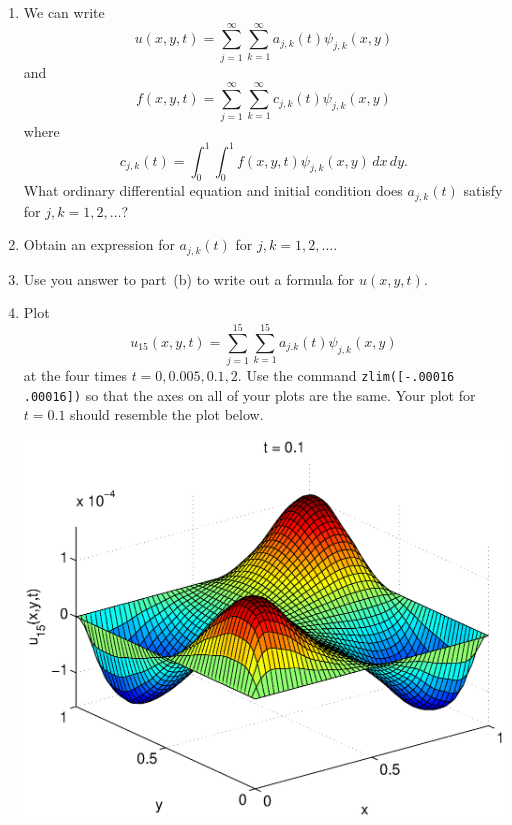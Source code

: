 \begin{enumerate}
\item We can write
\[
u(x,y,t) = \sum_{j=1}^\infty \sum_{k=1}^\infty a_{j,k}(t) \psi_{j,k} (x,y)
\]
and
\[
f(x,y,t) = \sum_{j=1}^\infty \sum_{k=1}^\infty c_{j,k}(t) \psi_{j,k} (x,y)
\]
where
\[
c_{j,k}(t) = \int_0^1 \int_0^1 f(x,y,t) \psi_{j,k} (x,y)\,dx\,dy.
\]
What ordinary differential equation and initial condition does $a_{j,k}(t)$ satisfy for $j,k = 1,2,\ldots$?
\\
\item Obtain an expression for $a_{j,k}(t)$ for $j,k=1,2,\ldots$.
\\
\item Use you answer to part~(b) to write out a formula for $u(x,y,t)$.
\\
\item Plot
\[
u_{15}(x,y,t) = \sum_{j=1}^{15} \sum_{k=1}^{15}a_{j.k}(t)\psi_{j,k}(x,y)
\]
at the four times $t=0, 0.005, 0.1, 2$. Use the command \verb|zlim([-.00016 .00016])| so that the axes on all of your plots are the same. Your plot for $t=0.1$ should resemble the plot below.

\begin{center}\includegraphics[scale=0.6]{heat2d3} \end{center}
\end{enumerate}




